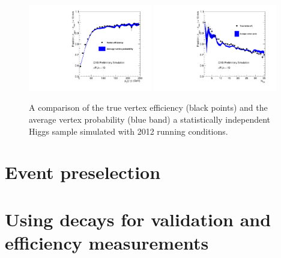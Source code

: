 \begin{figure}
  \includegraphics[width=0.48\textwidth]{ch3_comm_anal_comps/plots/vertex_bdt_prob_efficiency_pt.pdf}
  \includegraphics[width=0.48\textwidth]{ch3_comm_anal_comps/plots/vertex_bdt_prob_efficiency_nvtx.pdf}
  \caption{A comparison of the true vertex efficiency (black points) and the average vertex probability (blue band) a statistically independent \MC Higgs sample simulated with 2012 running conditions.}
  \label{fig:vertex_bdt_prob_efficiency}
\end{figure}

\section{Event preselection}
\label{sec:photon_presel}

\section{Using \Zee decays for validation and efficiency measurements}
\label{sec:zee}

